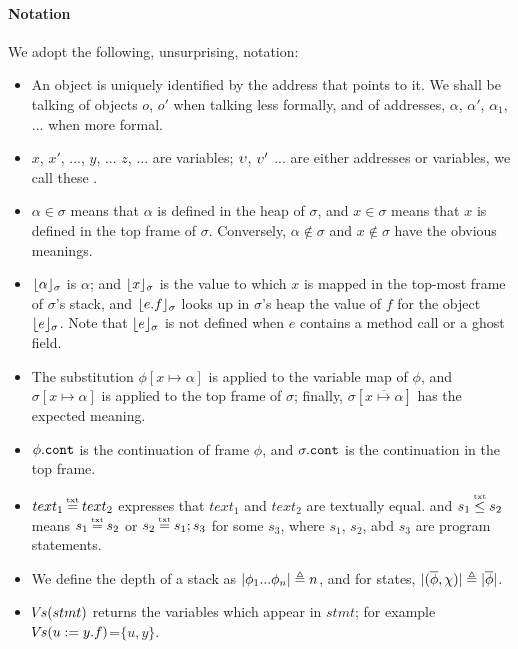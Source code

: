 \paragraph{Notation} We adopt the following, unsurprising, notation:
\begin{itemize}
\item
{An object is uniquely identified by the address that points to it. We shall be talking of objects $o$, $o'$ when talking less formally, and of addresses, $\alpha$, $\alpha'$, $\alpha_1$, ...  when more formal.}
\item
$x$, $x'$,  ..., $y$, ... $z$, ... are variables;  $\upsilon$, $\upsilon'$ ... are either addresses or variables, we call these \emph{\atoms}.
\item
$\alpha \in \sigma$ means that $\alpha$ is defined in the heap of $\sigma$, and $x\in \sigma$ means that $x$ is defined in the top frame of $\sigma$.
Conversely,  $\alpha\notin\sigma$ and $x\notin\sigma$ %
 have the obvious meanings.
\item
$\lfloor \alpha \rfloor_{\sigma}$  is $\alpha$; and $\lfloor x \rfloor_{\sigma}$  is the value to which  $x$  is mapped in the top-most frame of $\sigma$'s stack, 
and $\lfloor e.f \rfloor_{\sigma}$ looks up in $\sigma$'s heap the value of $f$ for the object  $\lfloor e \rfloor_{\sigma}$.
Note that $\lfloor e \rfloor_{\sigma}$ is not defined when $e$ contains a method call or a ghost field.
\item The substitution
$\phi[x \mapsto \alpha]$ is applied to the variable map  of $\phi$,  
and  $\sigma[x \mapsto \alpha]$ is applied to the top frame of $\sigma$; finally,  $\sigma[\overline{x \mapsto \alpha}]$ %
has the expected meaning.
\item
$\phi.\mbox{\normalfont{\texttt{cont}}}$ is the continuation of frame $\phi$, and  $\sigma.\mbox{\normalfont{\texttt{cont}}}$ is the continuation in the top frame.
\item
$text_1 \txteq text_2$ expresses that $text_1$ and $text_2$ are textually equal.  
and $s_1 \txtin   s_2$  means  $s_1 \txteq  s_2$ or  $s_2 \txteq  s_1; s_3$ for some $s_3$, where $s_1$, $s_2$, abd $s_3$ are program statements. 
\item
{We define the depth of a stack as $|\phi_1...\phi_n| \triangleq n$, and for states, $|(\overline \phi, \chi)| \triangleq  |\overline \phi|$.}
\item
{ ${\hspace{-1pt}V\hspace{-1pt}}s(stmt)$ returns the variables which appear in $stmt$; for example ${\hspace{-1pt}V\hspace{-1pt}}s(u:=y.f)$=$\{u,y\}$.}
\end{itemize}

